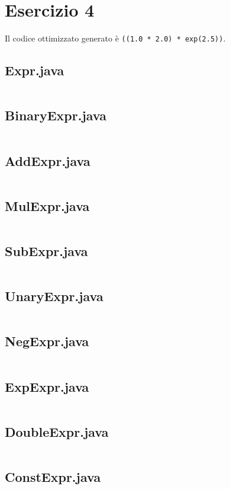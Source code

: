 \section*{Esercizio 4}

Il codice ottimizzato generato è \texttt{((1.0 * 2.0) * exp(2.5))}.

\subsection*{Expr.java}
\inputminted{java}{tex/src/4/Expr.java}

\subsection*{BinaryExpr.java}
\inputminted{java}{tex/src/4/BinaryExpr.java}

\subsection*{AddExpr.java}
\inputminted{java}{tex/src/4/AddExpr.java}

\subsection*{MulExpr.java}
\inputminted{java}{tex/src/4/MulExpr.java}

\subsection*{SubExpr.java}
\inputminted{java}{tex/src/4/SubExpr.java}

\subsection*{UnaryExpr.java}
\inputminted{java}{tex/src/4/UnaryExpr.java}

\subsection*{NegExpr.java}
\inputminted{java}{tex/src/4/NegExpr.java}

\subsection*{ExpExpr.java}
\inputminted{java}{tex/src/4/ExpExpr.java}

\subsection*{DoubleExpr.java}
\inputminted{java}{tex/src/4/DoubleExpr.java}

\subsection*{ConstExpr.java}
\inputminted{java}{tex/src/4/ConstExpr.java}

